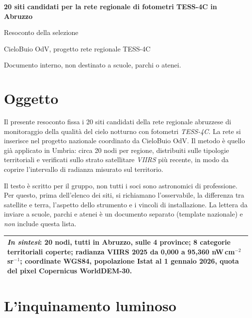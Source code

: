 \documentclass[11pt,a4paper]{report}
\newcommand{\infobox}[1]{%

  \begin{center}

  \renewcommand{\arraystretch}{1.5}

  \begin{tabularx}{\linewidth}{X}
    \arrayrulecolor{linegray}
    \toprule
    #1 \\
    \bottomrule
  \end{tabularx}

  \end{center}

}
\begin{document}
\begin{center}

{\LARGE\bfseries\color{nightblue} 20 siti candidati per la rete regionale di fotometri TESS-4C in Abruzzo\par}

\vspace{0.2cm}

{\large Resoconto della selezione\par}

\vspace{0.1cm}

{\small CieloBuio OdV, progetto rete regionale TESS-4C\par}

{\small Documento interno, non destinato a scuole, parchi o atenei.}

\end{center}

\section*{Oggetto}

Il presente resoconto fissa i 20 siti candidati della rete regionale abruzzese di monitoraggio della qualità del cielo notturno con fotometri \textit{TESS-4C}. La rete si inserisce nel progetto nazionale coordinato da CieloBuio OdV. Il metodo è quello già applicato in Umbria: circa 20 nodi per regione, distribuiti sulle tipologie territoriali e verificati sullo strato satellitare \textit{VIIRS} più recente, in modo da coprire l'intervallo di radianza misurato sul territorio.

Il testo è scritto per il gruppo, non tutti i soci sono astronomici di professione. Per questo, prima dell'elenco dei siti, si richiamano l'osservabile, la differenza tra satellite e terra, l'aspetto dello strumento e i vincoli di installazione. La lettera da inviare a scuole, parchi e atenei è un documento separato (template nazionale) e \textit{non} include questa lista.

\infobox{%
\textit{In sintesi}: 20 nodi, tutti in Abruzzo, sulle 4 province; 8 categorie territoriali coperte; radianza VIIRS 2025 da 0,000 a 95,360 nW\,cm$^{-2}$\,sr$^{-1}$; coordinate WGS84, popolazione Istat al 1 gennaio 2026, quota del pixel Copernicus WorldDEM-30.
}

\section*{L'inquinamento luminoso}
\end{document}
